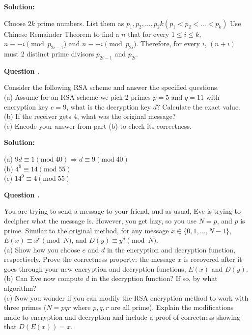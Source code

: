 \documentclass[12pt]{article}
\newcounter{questionnumber}
\newenvironment{question}[1][]{\stepcounter{questionnumber}\par\noindent\textbf{Question \thequestionnumber. #1}\par}{\par}
\newenvironment{solution}{\par\noindent\textbf{Solution:}\par}{\par\vspace{1em}}
\begin{document}
\begin{solution}
    Choose $2k$ prime numbers. List them as $p_1, p_2, \dots, p_2k(p_1<p_2<\dots<p_k)$
    Use Chinese Remainder Theorem to find a $n$ that for every $1\leq i\leq k$, $n\equiv -i\pmod{p_{2i-1}}$ and $n\equiv -i\pmod{p_{2i}}$.
    Therefore, for every $i$, $(n+i)$ must 2 distinct prime divisors $p_{2i-1}$ and $p_{2i}$.
\end{solution}
\begin{question}
    Consider the following RSA scheme and answer the specified questions.\\
    (a) Assume for an RSA scheme we pick 2 primes $p = 5$ and $q = 11$ with encryption key $e = 9$, what is the decryption key $d$? Calculate the exact value.\\
    (b) If the receiver gets 4, what was the original message?\\
    (c) Encode your answer from part (b) to check its correctness.
\end{question}
\begin{solution}
    \noindent
    (a) $9d\equiv 1\left( \mathrm{mod}\;40 \right) \Longrightarrow d\equiv 9\left( \mathrm{mod}\;40 \right) $\\
    (b) $4^9\equiv 14\left( \mathrm{mod}\;55 \right) $\\
    (c) $14^9\equiv 4\left( \mathrm{mod}\;55 \right) $
\end{solution}
\begin{question}
    You are trying to send a message to your friend, and as usual, Eve is trying to decipher what the message is. However, you get lazy, so you use $N = p$, and $p$ is prime. Similar to the original method, for any message $x \in \{0, 1, \ldots, N - 1\}$, $E(x) \equiv x^e \pmod{N}$, and $D(y) \equiv y^d \pmod{N}$.\\
    (a) Show how you choose $e$ and $d$ in the encryption and decryption function, respectively. Prove the correctness property: the message $x$ is recovered after it goes through your new encryption and decryption functions, $E(x)$ and $D(y)$.\\
    (b) Can Eve now compute $d$ in the decryption function? If so, by what algorithm?\\
    (c) Now you wonder if you can modify the RSA encryption method to work with three primes ($N = pqr$ where $p, q, r$ are all prime). Explain the modifications made to encryption and decryption and include a proof of correctness showing that $D(E(x)) = x$.
\end{question}
\end{document}
